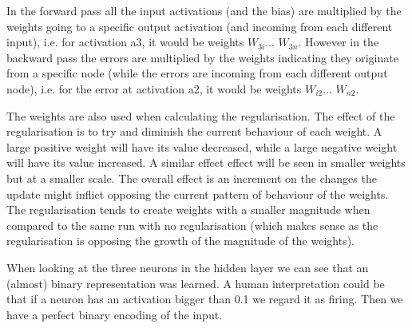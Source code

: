 \documentclass[a4paper]{article}
\begin{document}
In the forward pass all the input activations (and the bias) are multiplied by the weights going to a specific output activation (and incoming from each different input), i.e. for activation a3, it would be weights $W_{3i}$... $W_{3n}$. However in the backward pass the errors are multiplied by the weights indicating they originate from a specific node (while the errors are incoming from each different output node), i.e. for the error at activation a2, it would be weights $W_{i2}$... $W_{n2}$. 

The weights are also used when calculating the regularisation. The effect of the regularisation is to try and diminish the current behaviour of each weight. A large positive weight will have its value decreased, while a large negative weight will have its value increased. A similar effect effect will be seen in smaller weights but at a smaller scale. The overall effect is an increment on the changes the update might inflict opposing the current pattern of behaviour of the weights. The regularisation tends to create weights with a smaller magnitude when compared to the same run with no regularisation (which makes sense as the regularisation is opposing the growth of the magnitude of the weights).

When looking at the three neurons in the hidden layer we can see that an (almost) binary representation was learned. A human interpretation could be that if a neuron has an activation bigger than 0.1 we regard it as firing. Then we have a perfect binary encoding of the input.
\end{document}
